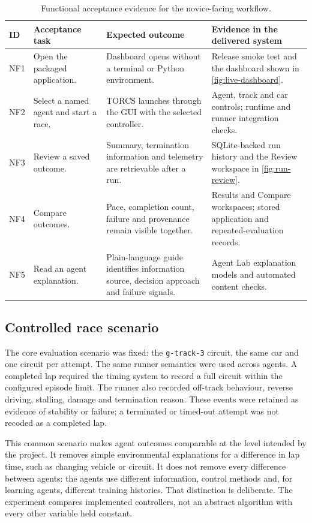 \begin{table}[htbp]
  \centering
  \caption{Functional acceptance evidence for the novice-facing workflow.}
  \label{tab:novice-acceptance}
  \small
  \begin{tabularx}{\textwidth}{p{}p{}YY}
    \toprule
    ID & Acceptance task & Expected outcome & Evidence in the delivered system \\
    \midrule
    NF1 & Open the packaged application. & Dashboard opens without a terminal or Python environment. & Release smoke test and the dashboard shown in \cref{fig:live-dashboard}. \\
    NF2 & Select a named agent and start a race. & TORCS launches through the GUI with the selected controller. & Agent, track and car controls; runtime and runner integration checks. \\
    NF3 & Review a saved outcome. & Summary, termination information and telemetry are retrievable after a run. & SQLite-backed run history and the Review workspace in \cref{fig:run-review}. \\
    NF4 & Compare outcomes. & Pace, completion count, failure and provenance remain visible together. & Results and Compare workspaces; stored application and repeated-evaluation records. \\
    NF5 & Read an agent explanation. & Plain-language guide identifies information source, decision approach and failure signals. & Agent Lab explanation models and automated content checks. \\
    \bottomrule
  \end{tabularx}
\end{table}

\subsection{Controlled race scenario}

The core evaluation scenario was fixed: the \texttt{g-track-3} circuit, the same car and one circuit per attempt. The same runner semantics were used across agents. A completed lap required the timing system to record a full circuit within the configured episode limit. The runner also recorded off-track behaviour, reverse driving, stalling, damage and termination reason. These events were retained as evidence of stability or failure; a terminated or timed-out attempt was not recoded as a completed lap.

This common scenario makes agent outcomes comparable at the level intended by the project. It removes simple environmental explanations for a difference in lap time, such as changing vehicle or circuit. It does not remove every difference between agents: the agents use different information, control methods and, for learning agents, different training histories. That distinction is deliberate. The experiment compares implemented controllers, not an abstract algorithm with every other variable held constant.

